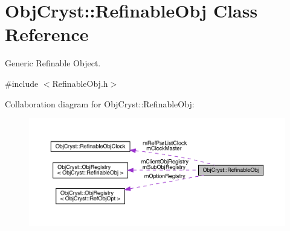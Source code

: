 \hypertarget{class_obj_cryst_1_1_refinable_obj}{}\section{Obj\+Cryst\+::Refinable\+Obj Class Reference}
\label{class_obj_cryst_1_1_refinable_obj}


Generic Refinable Object.  




{\ttfamily \#include $<$Refinable\+Obj.\+h$>$}



Collaboration diagram for Obj\+Cryst\+::Refinable\+Obj\+:
\nopagebreak
\begin{figure}[H]
\begin{center}
\leavevmode
\includegraphics[width=350pt]{class_obj_cryst_1_1_refinable_obj__coll__graph}
\end{center}
\end{figure}
